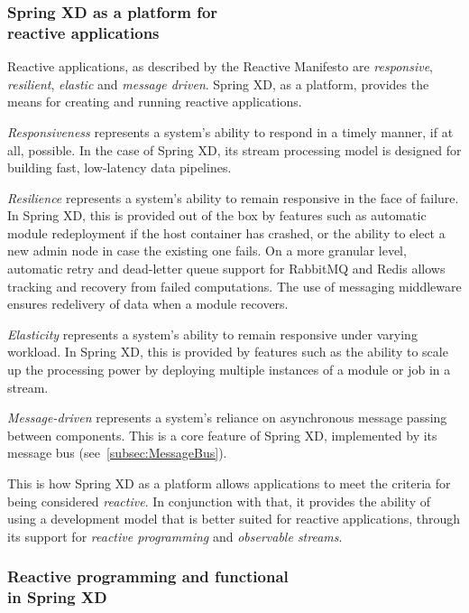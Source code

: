 \subsubsection {Spring XD as a platform for \\ reactive applications}

Reactive applications, as described by the Reactive \linebreak Manifesto
\cite{reactive} are \emph{responsive}, \emph{resilient}, \emph{elastic}
and \emph{message driven}. Spring XD, as a platform, provides the means for creating and
running reactive applications.

\emph{Responsiveness} represents a system's ability to respond in a timely manner, if
at all, possible. In the case of Spring XD, its stream processing model is designed
for building fast, low-latency data pipelines.

\emph{Resilience} represents a system's ability to remain responsive in the face of
failure. In Spring XD, this is provided out of the box by features such as automatic
module redeployment if the host container has crashed, or the ability to elect a new
admin node in case the existing one fails. On a more granular level, automatic retry
and dead-letter queue support for RabbitMQ and Redis allows tracking and recovery
from failed computations. The use of messaging middleware ensures redelivery of data
when a module recovers.

\emph{Elasticity} represents a system's ability to remain responsive under varying
workload. In Spring XD, this is provided by features such as the ability to scale up
the processing power by deploying multiple instances of a module or job in a stream.

\emph{Message-driven} represents a system's reliance on \linebreak
asynchronous message passing between components. This is a core
feature of Spring XD, implemented by its message bus (see~\ref{subsec:MessageBus}).

This is how Spring XD as a platform allows applications to meet the criteria for being
considered \emph{reactive}. In conjunction with that, it provides the ability of using
a development model that is better suited for reactive applications, through its support
for \emph{reactive programming} and \emph{observable streams}.

\subsubsection {Reactive programming and functional \\ in Spring XD}

